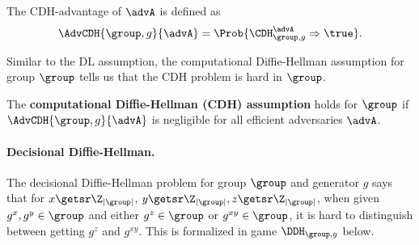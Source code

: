 The CDH-advantage of $\advA$ is defined as 
\begin{equation*}
\AdvCDH{\group, g}{\advA} = \Prob{\CDH^\advA_{\group, g}\Rightarrow\true}.
\end{equation*}

Similar to the DL assumption, the computational Diffie-Hellman assumption for group $\group$ tells us that the CDH problem is hard in $\group$.

\begin{definition}
	The \textbf{computational Diffie-Hellman (CDH) assumption} holds for $\group$ if $\AdvCDH{\group, g}{\advA}$ is negligible for all efficient adversaries $\advA$.
\end{definition}

\paragraph{Decisional Diffie-Hellman.} The decisional Diffie-Hellman problem for group $\group$ and generator $g$ says that for $x \getsr \Z_{|\group|}$, $y \getsr \Z_{|\group|}, z \getsr \Z_{|\group|}$, when given $g^x,g^y \in \group$ and either $g^z \in \group$ or $g^{xy} \in \group$, it is hard to distinguish between getting $g^z$ and $g^{xy}$. This is formalized in game $\DDH_{\group,g}$ below.  

\begin{center}

\end{center}

